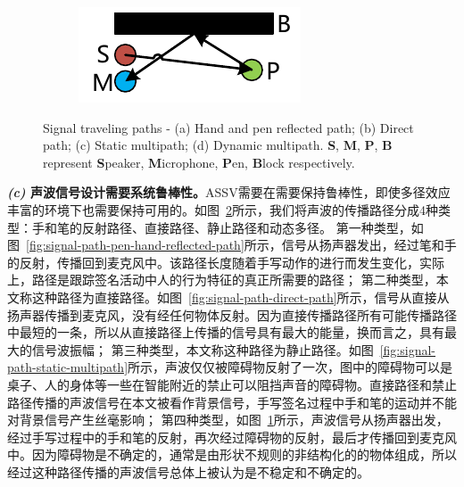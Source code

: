 \begin{figure}
\begin{subfigure}[b]{0.49\textwidth}
    \includegraphics[width=\textwidth]{figure/signal-path-dynamic-multipath}
    \caption{}
    \label{fig:signal-path-dynamic-multipath}
  \end{subfigure}
  {Signal traveling paths - (a) Hand and pen reflected path; (b) Direct path; (c) Static multipath; (d) Dynamic multipath. \textbf{S}, \textbf{M}, \textbf{P}, \textbf{B} represent \textbf{S}peaker, \textbf{M}icrophone, \textbf{P}en, \textbf{B}lock respectively.}
  \label{fig:signal-travel-paths}
\end{figure}

\textbf{\textit{(c)} 声波信号设计需要系统鲁棒性。}ASSV需要在需要保持鲁棒性，即使多径效应丰富的环境下也需要保持可用的。如图~\ref{fig:signal-travel-paths}所示，我们将声波的传播路径分成4种类型：手和笔的反射路径、直接路径、静止路径和动态多径。
第一种类型，如图~\ref{fig:signal-path-pen-hand-reflected-path}所示，信号从扬声器发出，经过笔和手的反射，传播回到麦克风中。该路径长度随着手写动作的进行而发生变化，实际上，路径是跟踪签名活动中人的行为特征的真正所需要的路径；
第二种类型，本文称这种路径为直接路径。如图~\ref{fig:signal-path-direct-path}所示，信号从直接从扬声器传播到麦克风，没有经任何物体反射。因为直接传播路径所有可能传播路径中最短的一条，所以从直接路径上传播的信号具有最大的能量，换而言之，具有最大的信号波振幅；
第三种类型，本文称这种路径为静止路径。如图~\ref{fig:signal-path-static-multipath}所示，声波仅仅被障碍物反射了一次，图中的障碍物可以是桌子、人的身体等一些在智能附近的禁止可以阻挡声音的障碍物。直接路径和禁止路径传播的声波信号在本文被看作背景信号，手写签名过程中手和笔的运动并不能对背景信号产生丝毫影响；
第四种类型，如图~\ref{fig:signal-path-dynamic-multipath}所示，声波信号从扬声器出发，经过手写过程中的手和笔的反射，再次经过障碍物的反射，最后才传播回到麦克风中。因为障碍物是不确定的，通常是由形状不规则的非结构化的的物体组成，所以经过这种路径传播的声波信号总体上被认为是不稳定和不确定的。

